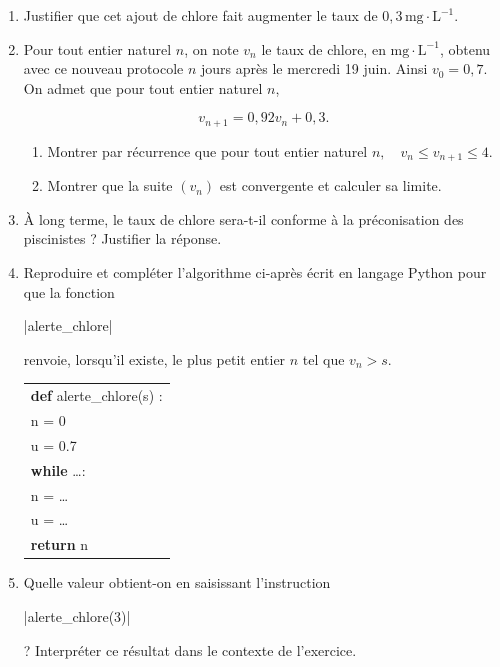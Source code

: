 \documentclass[10pt]{article}
\begin{document}
\begin{enumerate}
	\item Justifier que cet ajout de chlore fait augmenter le taux de $0,3\, \mathrm{mg \cdot L}^{-1}$.

	\item Pour tout entier naturel $n$, on note $v_{n}$ le taux de chlore, en $\mathrm{mg \cdot L}^{-1}$, obtenu avec ce nouveau protocole $n$ jours après le mercredi 19 juin. Ainsi $v_{0}=0,7$.\\
	On admet que pour tout entier naturel $n$, 
	
	\[v_{n+1}=0,92 v_{n}+ 0,3.\]
	\begin{enumerate}
		\item  Montrer par récurrence que pour tout entier naturel $n, \quad v_{n} \leqslant v_{n+1} \leqslant 4$.
		\item Montrer que la suite $\left(v_{n}\right)$ est convergente et calculer sa limite.
	\end{enumerate}

	\item À long terme, le taux de chlore sera-t-il conforme à la préconisation des piscinistes ? Justifier la réponse.

	\item Reproduire et compléter l'algorithme ci-après écrit en langage Python pour que la fonction {\begin{Verb}|alerte_chlore|\end{Verb}} renvoie, lorsqu'il existe, le plus petit entier $n$ tel que $v_{n}> s$.

	\begin{center}
	\begin{tabular}{|l|}\hline
		\textbf{def} alerte\_chlore(s) :\\
		\qquad n = 0\\
		\qquad u = 0.7\\
		\qquad \textbf{while} \ldots :\\
		\qquad \qquad n = \ldots \\
		\qquad \qquad u = \ldots\\
		\qquad \textbf{return} n\\ \hline
	\end{tabular}
\end{center}

	\item Quelle valeur obtient-on en saisissant l'instruction {\begin{Verb}|alerte_chlore(3)|\end{Verb}} ? Interpréter ce résultat dans le contexte de l'exercice.
\end{enumerate}
\end{document}
